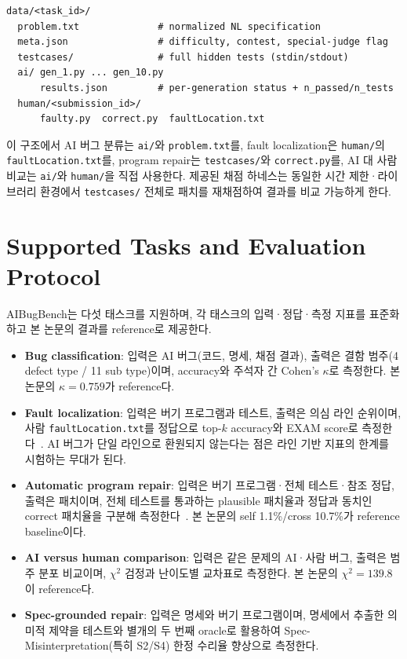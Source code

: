 \documentclass[10pt,conference]{IEEEtran}
\begin{document}
\begin{lstlisting}
data/<task_id>/
  problem.txt              # normalized NL specification
  meta.json                # difficulty, contest, special-judge flag
  testcases/               # full hidden tests (stdin/stdout)
  ai/ gen_1.py ... gen_10.py
      results.json         # per-generation status + n_passed/n_tests
  human/<submission_id>/
      faulty.py  correct.py  faultLocation.txt
\end{lstlisting}

이 구조에서 AI 버그 분류는 \texttt{ai/}와 \texttt{problem.txt}를, fault localization은 \texttt{human/}의 \texttt{faultLocation.txt}를, program repair는 \texttt{testcases/}와 \texttt{correct.py}를, AI 대 사람 비교는 \texttt{ai/}와 \texttt{human/}을 직접 사용한다. 제공된 채점 하네스는 동일한 시간 제한·라이브러리 환경에서 \texttt{testcases/} 전체로 패치를 재채점하여 결과를 비교 가능하게 한다.

\section{Supported Tasks and Evaluation Protocol}
AIBugBench는 다섯 태스크를 지원하며, 각 태스크의 입력·정답·측정 지표를 표준화하고 본 논문의 결과를 reference로 제공한다.
\begin{itemize}
\item \textbf{Bug classification}: 입력은 AI 버그(코드, 명세, 채점 결과), 출력은 결함 범주(4 defect type / 11 sub type)이며, accuracy와 주석자 간 Cohen's $\kappa$로 측정한다. 본 논문의 $\kappa=0.759$가 reference다.
\item \textbf{Fault localization}: 입력은 버기 프로그램과 테스트, 출력은 의심 라인 순위이며, 사람 \texttt{faultLocation.txt}를 정답으로 top-$k$ accuracy와 EXAM score로 측정한다~\cite{wong2016flsurvey}. AI 버그가 단일 라인으로 환원되지 않는다는 점은 라인 기반 지표의 한계를 시험하는 무대가 된다.
\item \textbf{Automatic program repair}: 입력은 버기 프로그램·전체 테스트·참조 정답, 출력은 패치이며, 전체 테스트를 통과하는 plausible 패치율과 정답과 동치인 correct 패치율을 구분해 측정한다~\cite{monperrus2018survey,xia2023llmapr}. 본 논문의 self 1.1\%/cross 10.7\%가 reference baseline이다.
\item \textbf{AI versus human comparison}: 입력은 같은 문제의 AI·사람 버그, 출력은 범주 분포 비교이며, $\chi^2$ 검정과 난이도별 교차표로 측정한다. 본 논문의 $\chi^2=139.8$이 reference다.
\item \textbf{Spec-grounded repair}: 입력은 명세와 버기 프로그램이며, 명세에서 추출한 의미적 제약을 테스트와 별개의 두 번째 oracle로 활용하여 Spec-Misinterpretation(특히 S2/S4) 한정 수리율 향상으로 측정한다.
\end{itemize}
\end{document}

